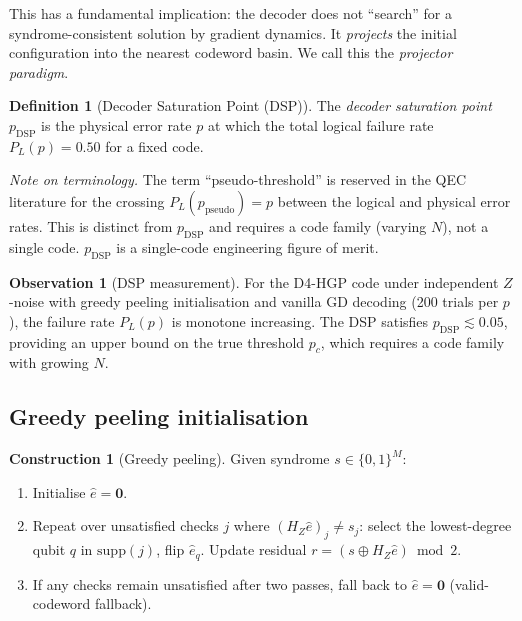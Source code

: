 \documentclass[12pt,a4paper]{article}
\theoremstyle{plain}
\theoremstyle{definition}
\newtheorem{definition}[theorem]{Definition}
\newtheorem{construction}[theorem]{Construction}
\newtheorem{observation}[theorem]{Observation}
\theoremstyle{remark}
\newcommand{\HZ}{H_Z}
\begin{document}
This has a fundamental implication: the decoder does not ``search'' for
a syndrome-consistent solution by gradient dynamics.
It \emph{projects} the initial configuration into the nearest codeword
basin.
We call this the \emph{projector paradigm}.

\begin{definition}[Decoder Saturation Point (DSP)]
The \emph{decoder saturation point} $p_{\mathrm{DSP}}$ is the physical
error rate $p$ at which the total logical failure rate $P_L(p) = 0.50$
for a fixed code.

\emph{Note on terminology.}
The term ``pseudo-threshold'' is reserved in the QEC literature for the
crossing $P_L(p_{\mathrm{pseudo}}) = p$ between the logical and physical
error rates.
This is distinct from $p_{\mathrm{DSP}}$ and requires a code family
(varying $N$), not a single code.
$p_{\mathrm{DSP}}$ is a single-code engineering figure of merit.
\end{definition}

\begin{observation}[DSP measurement]
For the D4-HGP code under independent $Z$-noise with greedy peeling
initialisation and vanilla GD decoding (200 trials per $p$), the failure
rate $P_L(p)$ is monotone increasing.
The DSP satisfies $p_{\mathrm{DSP}} \lesssim 0.05$, providing an upper
bound on the true threshold $p_c$, which requires a code family with
growing $N$.
\end{observation}

\subsection{Greedy peeling initialisation}

\begin{construction}[Greedy peeling]\label{con:peeling}
Given syndrome $s\in\{0,1\}^M$:
\begin{enumerate}[noitemsep]
\item Initialise $\hat{e} = \bm{0}$.
\item Repeat over unsatisfied checks $j$ where $(\HZ\hat{e})_j \neq s_j$:
  select the lowest-degree qubit $q$ in $\mathrm{supp}(j)$, flip $\hat{e}_q$.
  Update residual $r = (s \oplus \HZ\hat{e}) \bmod 2$.
\item If any checks remain unsatisfied after two passes, fall back to
  $\hat{e} = \bm{0}$ (valid-codeword fallback).
\end{enumerate}
\end{construction}
\end{document}
